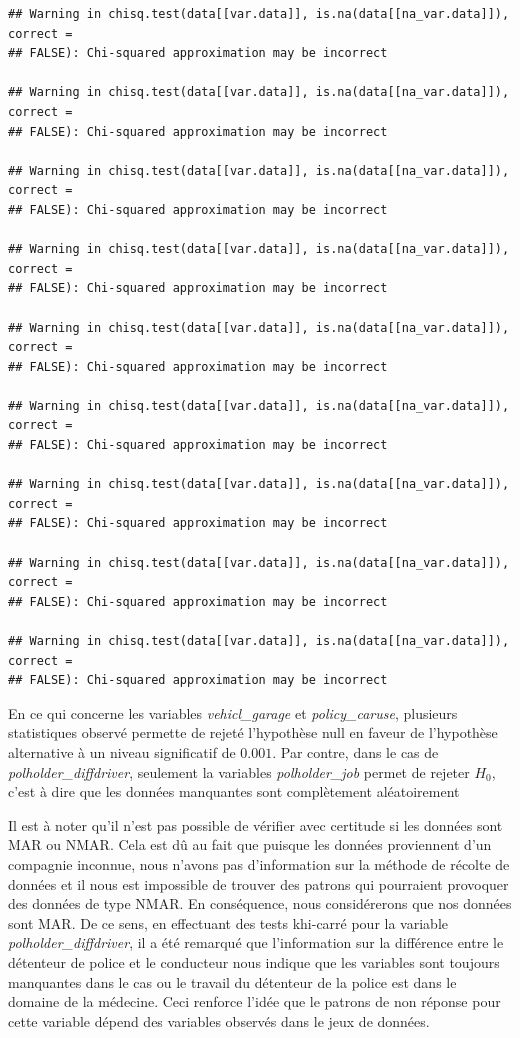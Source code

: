 \documentclass[
]{article}
\begin{document}
\begin{verbatim}
## Warning in chisq.test(data[[var.data]], is.na(data[[na_var.data]]), correct =
## FALSE): Chi-squared approximation may be incorrect

## Warning in chisq.test(data[[var.data]], is.na(data[[na_var.data]]), correct =
## FALSE): Chi-squared approximation may be incorrect

## Warning in chisq.test(data[[var.data]], is.na(data[[na_var.data]]), correct =
## FALSE): Chi-squared approximation may be incorrect

## Warning in chisq.test(data[[var.data]], is.na(data[[na_var.data]]), correct =
## FALSE): Chi-squared approximation may be incorrect

## Warning in chisq.test(data[[var.data]], is.na(data[[na_var.data]]), correct =
## FALSE): Chi-squared approximation may be incorrect

## Warning in chisq.test(data[[var.data]], is.na(data[[na_var.data]]), correct =
## FALSE): Chi-squared approximation may be incorrect

## Warning in chisq.test(data[[var.data]], is.na(data[[na_var.data]]), correct =
## FALSE): Chi-squared approximation may be incorrect

## Warning in chisq.test(data[[var.data]], is.na(data[[na_var.data]]), correct =
## FALSE): Chi-squared approximation may be incorrect

## Warning in chisq.test(data[[var.data]], is.na(data[[na_var.data]]), correct =
## FALSE): Chi-squared approximation may be incorrect
\end{verbatim}

En ce qui concerne les variables \emph{vehicl\_garage} et
\emph{policy\_caruse}, plusieurs statistiques observé permette de rejeté
l'hypothèse null en faveur de l'hypothèse alternative à un niveau
significatif de \(0.001%
\). Par contre, dans le cas de \emph{polholder\_diffdriver}, seulement
la variables \emph{polholder\_job} permet de rejeter \(H_0\), c'est à
dire que les données manquantes sont complètement aléatoirement

Il est à noter qu'il n'est pas possible de vérifier avec certitude si
les données sont MAR ou NMAR. Cela est dû au fait que puisque les
données proviennent d'un compagnie inconnue, nous n'avons pas
d'information sur la méthode de récolte de données et il nous est
impossible de trouver des patrons qui pourraient provoquer des données
de type NMAR. En conséquence, nous considérerons que nos données sont
MAR. De ce sens, en effectuant des tests khi-carré pour la variable
\emph{polholder\_diffdriver}, il a été remarqué que l'information sur la
différence entre le détenteur de police et le conducteur nous indique
que les variables sont toujours manquantes dans le cas ou le travail du
détenteur de la police est dans le domaine de la médecine. Ceci renforce
l'idée que le patrons de non réponse pour cette variable dépend des
variables observés dans le jeux de données.
\end{document}

